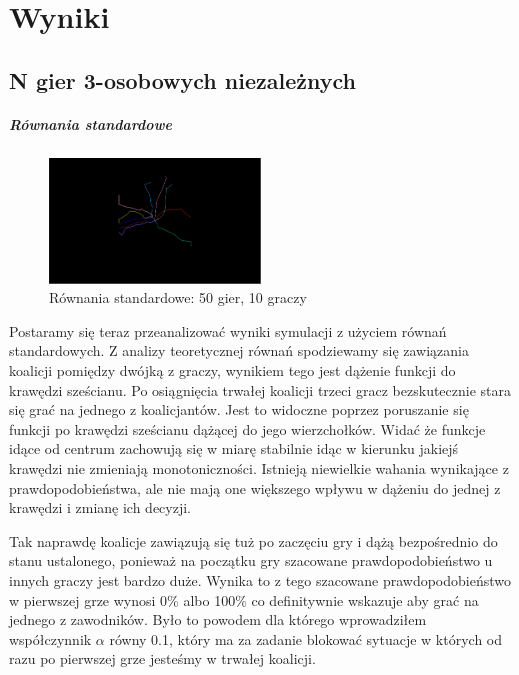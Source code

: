 \chapter{Wyniki}
\label{cha:wyniki}

\section{N gier 3-osobowych niezależnych}
\label{sec:N3nzal}

\paragraph{Równania standardowe}
\label{sec:r_stan}
\begin{figure}
    \centering
    \includegraphics[width=0.5\textwidth]{pict/wyniki/stand50_10.png}   
    \caption{Równania standardowe: 50 gier, 10 graczy}
	\label{fig:stand50_10} 
\end{figure}

Postaramy się teraz przeanalizować wyniki symulacji z użyciem równań standardowych. Z analizy teoretycznej równań spodziewamy się zawiązania koalicji pomiędzy dwójką z graczy, wynikiem tego jest dążenie funkcji do krawędzi sześcianu. Po osiągnięcia trwałej koalicji trzeci gracz bezskutecznie stara się grać na jednego z koalicjantów. Jest to widoczne poprzez poruszanie się funkcji po krawędzi sześcianu dążącej do jego wierzchołków. Widać że funkcje idące od centrum zachowują się w miarę stabilnie idąc w kierunku jakiejś krawędzi nie zmieniają monotoniczności. Istnieją niewielkie wahania wynikające z prawdopodobieństwa, ale nie mają one większego wpływu w dążeniu do jednej z krawędzi i zmianę ich decyzji. 

Tak naprawdę koalicje zawiązują się tuż po zaczęciu gry i dążą bezpośrednio do stanu ustalonego,  ponieważ na początku gry szacowane prawdopodobieństwo u innych graczy jest bardzo duże. Wynika to z tego szacowane prawdopodobieństwo w pierwszej grze wynosi 0\% albo 100\% co definitywnie wskazuje aby grać na jednego z zawodników. Było to powodem dla którego wprowadziłem współczynnik $\alpha$ równy 0.1, który ma za zadanie blokować sytuacje w których od razu po pierwszej grze jesteśmy w trwałej koalicji.

